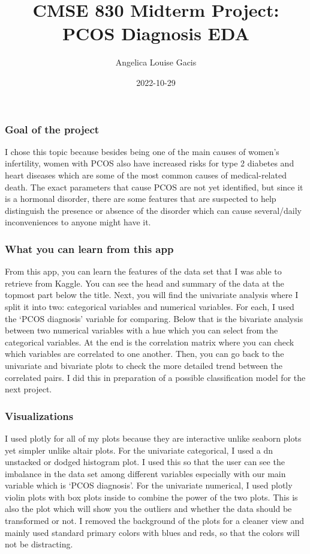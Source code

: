 \documentclass[
  8pt,
]{article}
\title{CMSE 830 Midterm Project: PCOS Diagnosis EDA}
\author{Angelica Louise Gacis}
\date{2022-10-29}
\begin{document}
\maketitle

\singlespacing

\hypertarget{goal-of-the-project}{%
\subsubsection{Goal of the project}\label{goal-of-the-project}}

I chose this topic because besides being one of the main causes of
women's infertility, women with PCOS also have increased risks for type
2 diabetes and heart diseases which are some of the most common causes
of medical-related death. The exact parameters that cause PCOS are not
yet identified, but since it is a hormonal disorder, there are some
features that are suspected to help distinguish the presence or absence
of the disorder which can cause several/daily inconveniences to anyone
might have it.

\hypertarget{what-you-can-learn-from-this-app}{%
\subsubsection{What you can learn from this
app}\label{what-you-can-learn-from-this-app}}

From this app, you can learn the features of the data set that I was
able to retrieve from Kaggle. You can see the head and summary of the
data at the topmost part below the title. Next, you will find the
univariate analysis where I split it into two: categorical variables and
numerical variables. For each, I used the `PCOS diagnosis' variable for
comparing. Below that is the bivariate analysis between two numerical
variables with a hue which you can select from the categorical
variables. At the end is the correlation matrix where you can check
which variables are correlated to one another. Then, you can go back to
the univariate and bivariate plots to check the more detailed trend
between the correlated pairs. I did this in preparation of a possible
classification model for the next project.

\hypertarget{visualizations}{%
\subsubsection{Visualizations}\label{visualizations}}

I used plotly for all of my plots because they are interactive unlike
seaborn plots yet simpler unlike altair plots. For the univariate
categorical, I used a dn unstacked or dodged histogram plot. I used this
so that the user can see the imbalance in the data set among different
variables especially with our main variable which is `PCOS diagnosis'.
For the univariate numerical, I used plotly violin plots with box plots
inside to combine the power of the two plots. This is also the plot
which will show you the outliers and whether the data should be
transformed or not. I removed the background of the plots for a cleaner
view and mainly used standard primary colors with blues and reds, so
that the colors will not be distracting.
\end{document}

